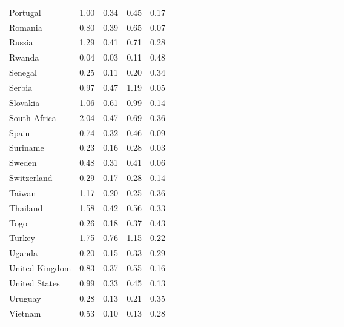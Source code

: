 \begin{ThreePartTable}
\begin{longtable}[t]{l|r|rrrl|r|rrrl|r|rrrl|r|rrrl|r|rrr}
Portugal & 1.00 & 0.34 & 0.45 & 0.17\\
Romania & 0.80 & 0.39 & 0.65 & 0.07\\
Russia & 1.29 & 0.41 & 0.71 & 0.28\\
Rwanda & 0.04 & 0.03 & 0.11 & 0.48\\
Senegal & 0.25 & 0.11 & 0.20 & 0.34\\
Serbia & 0.97 & 0.47 & 1.19 & 0.05\\
Slovakia & 1.06 & 0.61 & 0.99 & 0.14\\
South Africa & 2.04 & 0.47 & 0.69 & 0.36\\
Spain & 0.74 & 0.32 & 0.46 & 0.09\\
Suriname & 0.23 & 0.16 & 0.28 & 0.03\\
Sweden & 0.48 & 0.31 & 0.41 & 0.06\\
Switzerland & 0.29 & 0.17 & 0.28 & 0.14\\
Taiwan & 1.17 & 0.20 & 0.25 & 0.36\\
Thailand & 1.58 & 0.42 & 0.56 & 0.33\\
Togo & 0.26 & 0.18 & 0.37 & 0.43\\
Turkey & 1.75 & 0.76 & 1.15 & 0.22\\
Uganda & 0.20 & 0.15 & 0.33 & 0.29\\
United Kingdom & 0.83 & 0.37 & 0.55 & 0.16\\
United States & 0.99 & 0.33 & 0.45 & 0.13\\
Uruguay & 0.28 & 0.13 & 0.21 & 0.35\\
Vietnam & 0.53 & 0.10 & 0.13 & 0.28\\*
\end{longtable}
\end{ThreePartTable}
\endgroup{}
